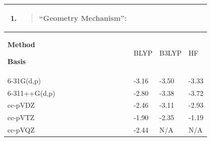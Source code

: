 \begin{table}
  \centering
  \caption[Charge transfer dependence of  asymmetric stretch frequencies]{Dependence of CT contributions to the \(\nu_3\) frequency based on functional (BLYP, B3LYP, and HF) and basis set (SP, LP, VDZ, VTZ, and VQZ). Calculations are on an optimized gas-phase cluster of  with a single cation/anion pair. All frequencies reported in \si{\wavenumber}. We distinguish two mechanisms by which CT can enter the frequency: (i) a ``geometry mechanism'' where CT determines the optimized geometry of the cluster, calculated as the difference between standard harmonic frequency results at the optimized standard (``CT on'') and ALMO (``CT off'') geometries. (ii) a ``curvature mechanism'' where CT enters by modifying the force constant at the optimized geometry, calculated as the difference between the ``CT on'' and ``CT off'' frequencies at the optimized standard (``CT on'') geometry.}
  \label{paper_02:tab:3}
  \begin{longtable}[]{@{}llll@{}}
    \toprule
    \begin{minipage}[b]{0.24\columnwidth}\raggedright
      \begin{enumerate}
        \def\labelenumi{(\roman{enumi})}
      \item
        \begin{quote}
          \textbf{``Geometry Mechanism'':}
        \end{quote}
      \end{enumerate}\strut
    \end{minipage}\tabularnewline
    \midrule
    \endhead
    \begin{minipage}[t]{0.24\columnwidth}\raggedright
      \textbf{Method}

      \textbf{Basis}\strut
    \end{minipage} & \begin{minipage}[t]{0.24\columnwidth}\raggedright
      BLYP\strut
    \end{minipage} & \begin{minipage}[t]{0.24\columnwidth}\raggedright
      B3LYP\strut
    \end{minipage} & \begin{minipage}[t]{0.24\columnwidth}\raggedright
      HF\strut
    \end{minipage}\tabularnewline
    6-31G(d,p) & -3.16 & -3.50 & -3.33\tabularnewline
    6-311++G(d,p) & -2.80 & -3.38 & -3.72\tabularnewline
    cc-pVDZ & -2.46 & -3.11 & -2.93\tabularnewline
    cc-pVTZ & -1.90 & -2.35 & -1.19\tabularnewline
    cc-pVQZ & -2.44 & N/A & N/A\tabularnewline
    \bottomrule
  \end{longtable}


\end{table}
